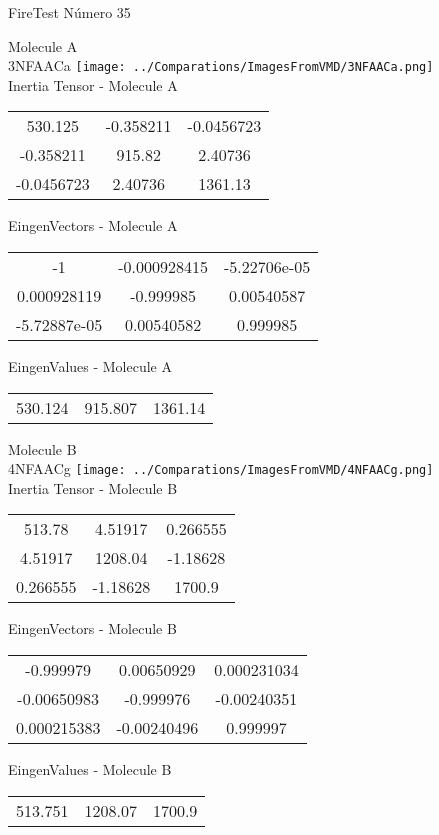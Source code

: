 \vtab[-2cm]
\begin{center}
{\large FireTest \tab Número 35}
\end{center}
\begin{multicols}{2}
\begin{center}

Molecule A \\ 
3NFAACa
\texttt{[image: ../Comparations/ImagesFromVMD/3NFAACa.png]}
\\
Inertia Tensor - Molecule A \\
\vtab

\begin{tabular}{|c c c|}
530.125	 & 	-0.358211	 & 	-0.0456723	 \\
-0.358211	 & 	915.82	 & 	2.40736	 \\
-0.0456723	 & 	2.40736	 & 	1361.13
\end{tabular}

\vtab
 EingenVectors - Molecule A     \\
\vtab
\begin{tabular}{|c c c|}
-1	 & 	-0.000928415	 & 	-5.22706e-05	 \\
0.000928119	 & 	-0.999985	 & 	0.00540587	 \\
-5.72887e-05	 & 	0.00540582	 & 	0.999985
\end{tabular}

\vtab
 EingenValues - Molecule A     \\
\vtab
\begin{tabular}{|c c c|}
530.124	 & 	915.807	 & 	1361.14	 \\
\end{tabular}
\columnbreak

Molecule B \\ 
4NFAACg
\texttt{[image: ../Comparations/ImagesFromVMD/4NFAACg.png]}
\\
Inertia Tensor - Molecule B \\
\vtab

\begin{tabular}{|c c c|}
513.78	 & 	4.51917	 & 	0.266555	 \\
4.51917	 & 	1208.04	 & 	-1.18628	 \\
0.266555	 & 	-1.18628	 & 	1700.9
\end{tabular}

\vtab
 EingenVectors - Molecule B     \\
\vtab
\begin{tabular}{|c c c|}
-0.999979	 & 	0.00650929	 & 	0.000231034	 \\
-0.00650983	 & 	-0.999976	 & 	-0.00240351	 \\
0.000215383	 & 	-0.00240496	 & 	0.999997
\end{tabular}

\vtab
 EingenValues - Molecule B     \\
\vtab
\begin{tabular}{|c c c|}
513.751	 & 	1208.07	 & 	1700.9	 \\
\end{tabular}

\end{center}
\end{multicols}
